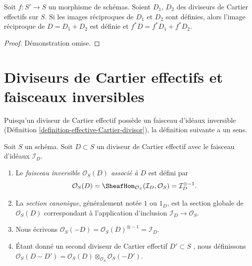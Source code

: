 \begin{lemma}
\label{lemma-pullback-effective-Cartier-divisors-additive}
Soit  $f : S' \to S$  un morphisme de schémas. Soient  $D_1$,  $D_2$  des
diviseurs de Cartier effectifs sur  $S$. Si les images réciproques de  $D_1$ 
et  $D_2$  sont définies, alors l'image réciproque de  $D = D_1 + D_2$  est définie et
 $f^*D = f^*D_1 + f^*D_2$.
\end{lemma}

\begin{proof}
Démonstration omise.
\end{proof}





\section{Diviseurs de Cartier effectifs et faisceaux inversibles}
\label{section-effective-Cartier-invertible}

\noindent
Puisqu'un diviseur de Cartier effectif possède un faisceau d'idéaux inversible
(Définition  \ref{definition-effective-Cartier-divisor}), la définition suivante a un sens.

\begin{definition}
\label{definition-invertible-sheaf-effective-Cartier-divisor}
Soit  $S$  un schéma. Soit  $D \subset S$  un diviseur de Cartier effectif
avec le faisceau d'idéaux  $\mathcal{I}_D$.
\begin{enumerate}
\item Le  {\it faisceau inversible $\mathcal{O}_S(D)$ associé
à $D$} est défini par
$$
\mathcal{O}_S(D) =
\SheafHom_{\mathcal{O}_S}(\mathcal{I}_D, \mathcal{O}_S) =
\mathcal{I}_D^{\otimes -1}.
$$
\item La  {\it section canonique}, généralement notée
 $1$  ou  $1_D$, est la section globale de  $\mathcal{O}_S(D)$ correspondant
à l'application d'inclusion $\mathcal{I}_D \to \mathcal{O}_S$.
\item Nous écrivons  $\mathcal{O}_S(-D) = \mathcal{O}_S(D)^{\otimes -1} = \mathcal{I}_D$.
\item Étant donné un second diviseur de Cartier effectif  $D' \subset S$ , nous définissons
 $\mathcal{O}_S(D - D') =
\mathcal{O}_S(D) \otimes_{\mathcal{O}_S} \mathcal{O}_S(-D')$.
\end{enumerate}
\end{definition}

